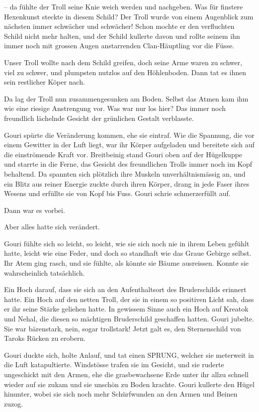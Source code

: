 – da fühlte der Troll seine Knie weich werden und nachgeben. Was für finstere Hexenkunst steckte in diesem Schild? Der Troll wurde von einem Augenblick zum nächsten immer schwächer und schwächer! Schon mochte er den verfluchten Schild nicht mehr halten, und der Schild kullerte davon und rollte seinem ihn immer noch mit grossen Augen anstarrenden Clan-Häuptling vor die Füsse.

Unser Troll wollte nach dem Schild greifen, doch seine Arme waren zu schwer, viel zu schwer, und plumpsten nutzlos auf den Höhlenboden. Dann tat es ihnen sein restlicher Köper nach.

Da lag der Troll nun zusammengesunken am Boden. Selbst das Atmen kam ihm wie eine riesige Anstrengung vor. Was war nur los hier? Das immer noch freundlich lächelnde Gesicht der grünlichen Gestalt verblasste.



\trennzeichen



Gouri spürte die Veränderung kommen, ehe sie eintraf. Wie die Spannung, die vor einem Gewitter in der Luft liegt, war ihr Körper aufgeladen und bereitete sich auf die einströmende Kraft vor. Breitbeinig stand Gouri oben auf der Hügelkuppe und starrte in die Ferne, das Gesicht des freundlichen Trolls immer noch im Kopf behaltend. Da spannten sich plötzlich ihre Muskeln unverhältnismässig an, und ein Blitz aus reiner Energie zuckte durch ihren Körper, drang in jede Faser ihres Wesens und erfüllte sie von Kopf bis Fuss. Gouri schrie schmerzerfüllt auf.

Dann war es vorbei.

Aber alles hatte sich verändert.

Gouri fühlte sich so leicht, so leicht, wie sie sich noch nie in ihrem Leben gefühlt hatte, leicht wie eine Feder, und doch so standhaft wie das Graue Gebirge selbst. Ihr Atem ging rasch, und sie fühlte, als könnte sie Bäume ausreissen. Konnte sie wahrscheinlich tatsächlich.

Ein Hoch darauf, dass sie sich an den Aufenthaltsort des Bruderschilds erinnert hatte. Ein Hoch auf den netten Troll, der sie in einem so positiven Licht sah, dass er ihr seine Stärke geliehen hatte. In gewissem Sinne auch ein Hoch auf Kreatok und Nehal, die diesen so mächtigen Bruderschild geschaffen hatten. Gouri jubelte. Sie war bärenstark, nein, sogar trollstark! Jetzt galt es, den Sternenschild von Taroks Rücken zu erobern.

Gouri duckte sich, holte Anlauf, und tat einen SPRUNG, welcher sie meterweit in die Luft katapultierte. Windstösse trafen sie im Gesicht, und sie ruderte ungeschickt mit den Armen, ehe die grasbewachsene Erde unter ihr allzu schnell wieder auf sie zukam und sie unschön zu Boden krachte. Gouri kullerte den Hügel hinunter, wobei sie sich noch mehr Schürfwunden an den Armen und Beinen zuzog.

